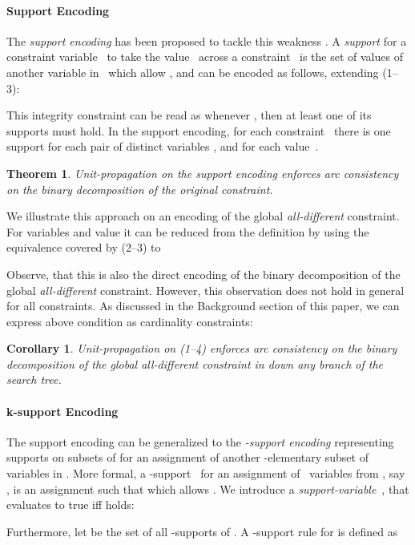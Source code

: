 \documentclass[letterpaper]{article}
\newtheorem{theorem}{Theorem}
\newtheorem{corollary}{Corollary}[theorem]
\begin{document}
\paragraph{Support Encoding}
The \emph{support encoding} has been proposed to
tackle this weakness \cite{gent02}. A \emph{support} for a constraint variable~ to take the value~ across a constraint~ is the set of values  of another variable in~ which allow , and can be encoded as follows, extending (1--3):

This integrity constraint can be read as whenever , then at least one of its supports must hold.
In the support encoding, for each constraint~ there is one support for each pair of distinct variables , and for each value~.
\begin{theorem}
Unit-propagation on the support encoding enforces arc consistency on the binary decomposition of the original constraint.
\end{theorem}
We illustrate this approach on an encoding of the global \emph{all-different} constraint. For variables  and value  it can be reduced from the definition by using the equivalence covered by (2--3) to

Observe, that this is also
the direct encoding of the binary decomposition of the global \emph{all-different} constraint. However, this observation does not hold in general for all constraints.
As discussed in the Background section of this paper, we can express above condition as  cardinality constraints:


\begin{corollary}
Unit-propagation on (1--4) enforces arc consistency on the binary decomposition of the global \emph{all-different} constraint in  down any branch of the search tree.
\end{corollary}


\paragraph{k-support Encoding}
The support encoding can be generalized to the \emph{-support encoding} \cite{behewa03a} representing supports on subsets of  for an assignment of another -elementary subset of variables in . More formal, a -support~ for an assignment  of ~variables from , say , is an assignment  such that  which allows . We introduce a \emph{support-variable}~, that evaluates to true iff  holds:

Furthermore, let  be the set of all -supports of . A -support rule for  is defined as
\end{document}
